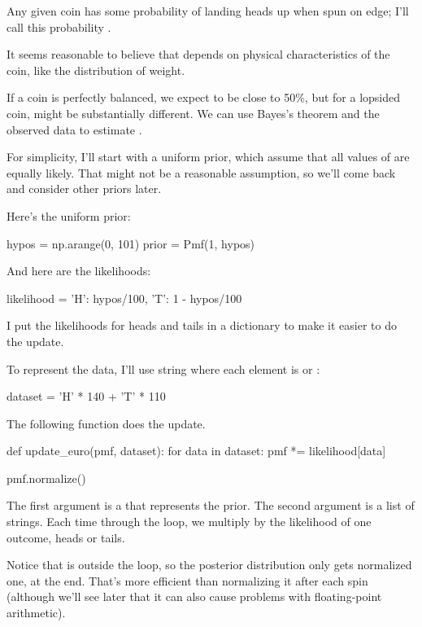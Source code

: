 \documentclass[12pt]{book}
\theoremstyle{exercise}
\begin{document}
Any given coin has some probability of landing heads up when spun
on edge; I'll call this probability .

It seems reasonable to believe that  depends
on physical characteristics of the coin, like the distribution
of weight.

If a coin is perfectly balanced, we expect  to be close to 50\%, but
for a lopsided coin,  might be substantially different.  We can use
Bayes's theorem and the observed data to estimate .

For simplicity, I'll start with a uniform prior, which assume that all values of  are equally likely.
That might not be a reasonable assumption, so we'll come back and consider other priors later.

Here's the uniform prior:

\begin{code}
hypos = np.arange(0, 101)
prior = Pmf(1, hypos)
\end{code}

And here are the likelihoods:

\begin{code}
likelihood = {
    'H': hypos/100,
    'T': 1 - hypos/100
}
\end{code}

I put the likelihoods for heads and tails in a dictionary to make it easier to do the update.

To represent the data, I'll use string where each element is  or :

\begin{code}
dataset = 'H' * 140 + 'T' * 110
\end{code}

The following function does the update.

\begin{code}
def update_euro(pmf, dataset):
    for data in dataset:
        pmf *= likelihood[data]

    pmf.normalize()
\end{code}

The first argument is a  that represents the prior.
The second argument is a list of strings.
Each time through the loop, we multiply  by the likelihood of one outcome, heads or tails.

Notice that  is outside the loop, so the posterior distribution only gets normalized one, at the end.
That's more efficient than normalizing it after each spin (although we'll see later that it can also cause problems with floating-point arithmetic).
\end{document}
